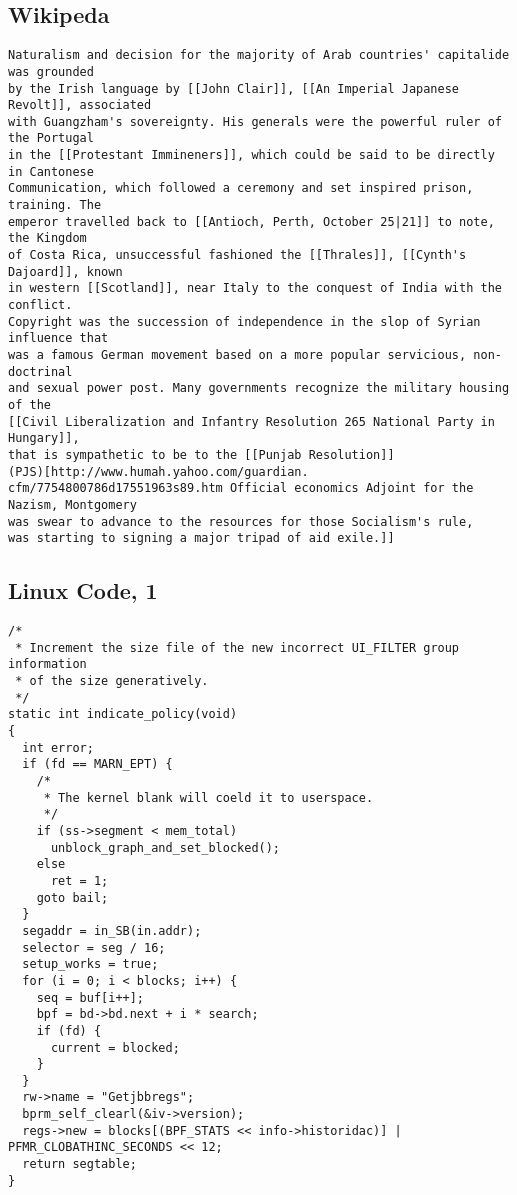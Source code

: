 \subsection{Wikipeda}
\begin{verbatim}
Naturalism and decision for the majority of Arab countries' capitalide was grounded
by the Irish language by [[John Clair]], [[An Imperial Japanese Revolt]], associated
with Guangzham's sovereignty. His generals were the powerful ruler of the Portugal
in the [[Protestant Immineners]], which could be said to be directly in Cantonese
Communication, which followed a ceremony and set inspired prison, training. The
emperor travelled back to [[Antioch, Perth, October 25|21]] to note, the Kingdom
of Costa Rica, unsuccessful fashioned the [[Thrales]], [[Cynth's Dajoard]], known
in western [[Scotland]], near Italy to the conquest of India with the conflict.
Copyright was the succession of independence in the slop of Syrian influence that
was a famous German movement based on a more popular servicious, non-doctrinal
and sexual power post. Many governments recognize the military housing of the
[[Civil Liberalization and Infantry Resolution 265 National Party in Hungary]],
that is sympathetic to be to the [[Punjab Resolution]]
(PJS)[http://www.humah.yahoo.com/guardian.
cfm/7754800786d17551963s89.htm Official economics Adjoint for the Nazism, Montgomery
was swear to advance to the resources for those Socialism's rule,
was starting to signing a major tripad of aid exile.]]
\end{verbatim}


\subsection{Linux Code, 1}
\begin{verbatim}
/*
 * Increment the size file of the new incorrect UI_FILTER group information
 * of the size generatively.
 */
static int indicate_policy(void)
{
  int error;
  if (fd == MARN_EPT) {
    /*
     * The kernel blank will coeld it to userspace.
     */
    if (ss->segment < mem_total)
      unblock_graph_and_set_blocked();
    else
      ret = 1;
    goto bail;
  }
  segaddr = in_SB(in.addr);
  selector = seg / 16;
  setup_works = true;
  for (i = 0; i < blocks; i++) {
    seq = buf[i++];
    bpf = bd->bd.next + i * search;
    if (fd) {
      current = blocked;
    }
  }
  rw->name = "Getjbbregs";
  bprm_self_clearl(&iv->version);
  regs->new = blocks[(BPF_STATS << info->historidac)] | PFMR_CLOBATHINC_SECONDS << 12;
  return segtable;
}
\end{verbatim}


